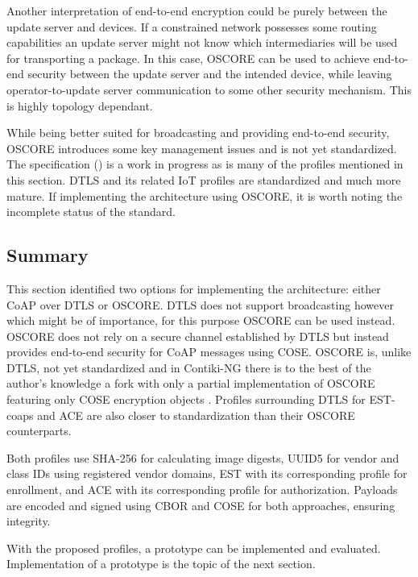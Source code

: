 \documentclass[0-thesis.tex]{subfiles}
\begin{document}
Another interpretation of end-to-end encryption could be purely between the update server
and devices. If a constrained network possesses some routing capabilities an update server
might not know which intermediaries will be used for transporting a package. In this case,
OSCORE can be used to achieve end-to-end security between the update server and the
intended device, while leaving operator-to-update server communication to some other
security mechanism. This is highly topology dependant.

While being better suited for broadcasting and providing end-to-end security, OSCORE
introduces some key management issues and is not yet standardized. The specification
(\parencite{oscore}) is a work in progress as is many of the profiles mentioned in this
section. DTLS and its related IoT profiles are standardized and much more mature. If
implementing the architecture using OSCORE, it is worth noting the incomplete status of
the standard.

\subsection{Summary}
\label{ssec:profiles-summary}
This section identified two options for implementing the architecture: either CoAP over
DTLS or OSCORE. DTLS does not support broadcasting however which might be of importance,
for this purpose OSCORE can be used instead. OSCORE does not rely on a secure channel
established by DTLS but instead provides end-to-end security for CoAP messages using COSE.
OSCORE is, unlike DTLS, not yet standardized and in Contiki-NG there is to the best of the
author's knowledge a fork with only a partial implementation of OSCORE featuring only COSE
encryption objects \parencite{contiki-oscore}. Profiles surrounding DTLS for EST-coaps and
ACE are also closer to standardization than their OSCORE counterparts.

Both profiles use SHA-256 for calculating image digests, UUID5 for vendor and class IDs
using registered vendor domains, EST with its corresponding profile for enrollment, and
ACE with its corresponding profile for authorization. Payloads are encoded and signed
using CBOR and COSE for both approaches, ensuring integrity.

With the proposed profiles, a prototype can be implemented and evaluated. Implementation
of a prototype is the topic of the next section.
\end{document}
